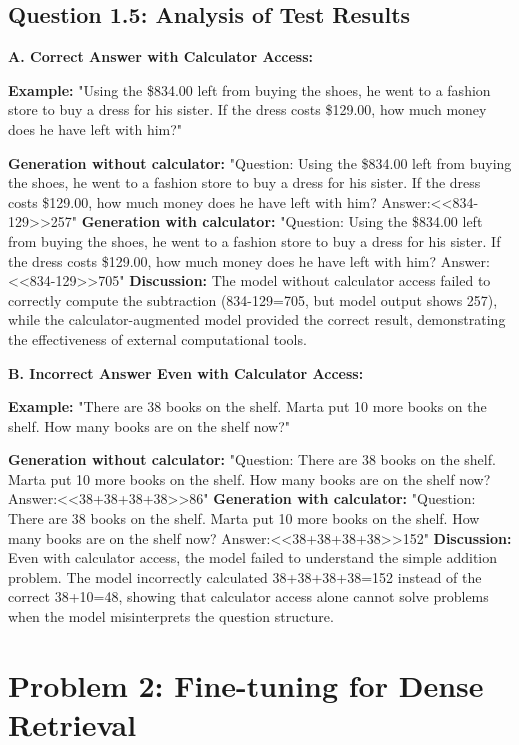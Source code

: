 \documentclass[11pt]{article}
\begin{document}
\subsection{Question 1.5: Analysis of Test Results}

\textbf{A. Correct Answer with Calculator Access:}

\textbf{Example:} "Using the \$834.00 left from buying the shoes, he went to a fashion store to buy a dress for his sister. If the dress costs \$129.00, how much money does he have left with him?"

\textbf{Generation without calculator:} "Question: Using the \$834.00 left from buying the shoes, he went to a fashion store to buy a dress for his sister. If the dress costs \$129.00, how much money does he have left with him? Answer:<<834-129>>257"
\textbf{Generation with calculator:} "Question: Using the \$834.00 left from buying the shoes, he went to a fashion store to buy a dress for his sister. If the dress costs \$129.00, how much money does he have left with him? Answer:<<834-129>>705"
\textbf{Discussion:} The model without calculator access failed to correctly compute the subtraction (834-129=705, but model output shows 257), while the calculator-augmented model provided the correct result, demonstrating the effectiveness of external computational tools.

\textbf{B. Incorrect Answer Even with Calculator Access:}

\textbf{Example:} "There are 38 books on the shelf. Marta put 10 more books on the shelf. How many books are on the shelf now?"

\textbf{Generation without calculator:} "Question: There are 38 books on the shelf. Marta put 10 more books on the shelf. How many books are on the shelf now? Answer:<<38+38+38+38>>86"
\textbf{Generation with calculator:} "Question: There are 38 books on the shelf. Marta put 10 more books on the shelf. How many books are on the shelf now? Answer:<<38+38+38+38>>152"
\textbf{Discussion:} Even with calculator access, the model failed to understand the simple addition problem. The model incorrectly calculated 38+38+38+38=152 instead of the correct 38+10=48, showing that calculator access alone cannot solve problems when the model misinterprets the question structure.

\section{Problem 2: Fine-tuning for Dense Retrieval}
\end{document}
